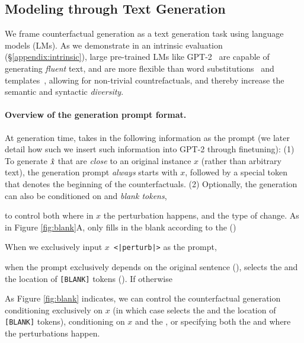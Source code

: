 \subsection{Modeling through Text Generation}
\label{subsec:nlg}

We frame counterfactual generation as a text generation task using language models (LMs).
As we demonstrate in an intrinsic evaluation (\S\ref{appendix:intrinsic}), large pre-trained LMs like GPT-2~\cite{radford2019language} are capable of generating \emph{fluent} text, and are more flexible than word substitutions~\cite{garg2019counterfactual} and templates~\cite{ribeiro2018sear}, allowing for non-trivial countrefactuals, and thereby increase the semantic and syntactic \emph{diversity}. 


\paragraph{Overview of the generation prompt format.}
At generation time, \sysname takes in the following information as the prompt (we later detail how such we insert such information into GPT-2 through finetuning): 
(1) To generate $\xp$ that are \emph{close} to an original instance $x$ (rather than arbitrary text), the generation prompt \emph{always} starts with $x$, followed by a special token that denotes the beginning of the counterfactuals.
(2) Optionally, the generation can also be conditioned on \emph{\tagstrs} and \emph{blank tokens}, \eg {}

to control both where in $x$ the perturbation happens, and the type of change.
As in Figure \ref{fig:blank}A, \sysname only fills in the blank according to the \tagstrshort ()

When we exclusively input \texttt{$x$ <|perturb|>} as the prompt, 


when the prompt exclusively depends on the original sentence (), \sysname selects the \tagstr and the location of \texttt{[BLANK]} tokens (\exinline{\ctrltag{[code]} $\xp$}).
If otherwise

As Figure \ref{fig:blank} indicates, we can control the counterfactual generation conditioning exclusively on $x$ (in which case \sysname selects the \tagstr and the location of \texttt{[BLANK]} tokens), conditioning on $x$ and the \tagstr, or specifying both the \tagstrshort and where the perturbations happen.




